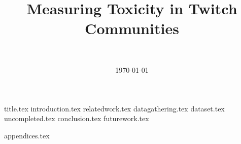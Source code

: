 \documentclass[final]{report}
\title{Measuring Toxicity in Twitch Communities}
\author{~}
\date{\today}
\begin{document}

{title.tex}
\newpage
{}\label{ch:contents}
\tableofcontents
\newpage
{}
{introduction.tex}
{relatedwork.tex}
{datagathering.tex}
{dataset.tex}
{uncompleted.tex}
{conclusion.tex}
{futurework.tex}
\newpage
{}

\printbibliography
{appendices.tex}
\end{document}
